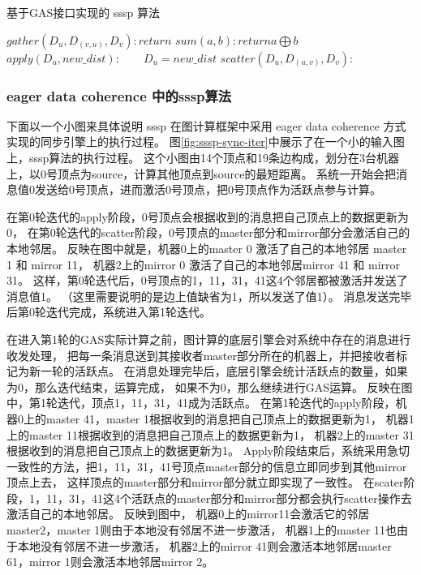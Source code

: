 \begin{algorithm}[!htbp]
  \small
  \caption{基于GAS接口实现的 sssp 算法}\label{alg:sssp}
  \begin{algorithmic}[1]
    \State $gather(D_u,D_{(v,u)},D_v): return$     
    \State $sum(a,b) : return a\bigoplus b $ 
    \State $apply(D_u, new\_dist): 
      \qquad D_u = new\_dist$
    \State $scatter(D_u, D_{(u,v)}, D_v):$     
    \EndIf
    \EndProcedure
  \end{algorithmic}
\end{algorithm}


\subsubsection{eager data coherence 中的sssp算法}
下面以一个小图来具体说明 sssp 在图计算框架中采用 eager data coherence 方式实现的同步引擎上的执行过程。
图\ref{fig:sssp-sync-iter}中展示了在一个小的输入图上，sssp算法的执行过程。
这个小图由14个顶点和19条边构成，划分在3台机器上，以0号顶点为source，计算其他顶点到source的最短距离。
系统一开始会把消息值0发送给0号顶点，进而激活0号顶点，把0号顶点作为活跃点参与计算。

在第0轮迭代的apply阶段，0号顶点会根据收到的消息把自己顶点上的数据更新为0，
在第0轮迭代的scatter阶段，0号顶点的master部分和mirror部分会激活自己的本地邻居。
反映在图中就是，机器0上的master 0 激活了自己的本地邻居 master 1 和 mirror 11，
机器2上的mirror 0 激活了自己的本地邻居mirror 41 和 mirror 31。
这样，第0轮迭代后，0号顶点的1，11，31，41这4个邻居都被激活并发送了消息值1。
（这里需要说明的是边上值缺省为1，所以发送了值1）。
消息发送完毕后第0轮迭代完成，系统进入第1轮迭代。

在进入第1轮的GAS实际计算之前，图计算的底层引擎会对系统中存在的消息进行收发处理，
把每一条消息送到其接收者master部分所在的机器上，并把接收者标记为新一轮的活跃点。
在消息处理完毕后，底层引擎会统计活跃点的数量，如果为0，那么迭代结束，运算完成，
如果不为0，那么继续进行GAS运算。
反映在图中，第1轮迭代，顶点1，11，31，41成为活跃点。
在第1轮迭代的apply阶段，机器0上的master 41，master 1根据收到的消息把自己顶点上的数据更新为1，
机器1上的master 11根据收到的消息把自己顶点上的数据更新为1，
机器2上的master 31根据收到的消息把自己顶点上的数据更新为1。
Apply阶段结束后，系统采用急切一致性的方法，把1，11，31，41号顶点master部分的信息立即同步到其他mirror顶点上去，
这样顶点的master部分和mirror部分就立即实现了一致性。
在scater阶段，1，11，31，41这4个活跃点的master部分和mirror部分都会执行scatter操作去激活自己的本地邻居。
反映到图中，
机器0上的mirror11会激活它的邻居master2，master 1则由于本地没有邻居不进一步激活，
机器1上的master 11也由于本地没有邻居不进一步激活，
机器2上的mirror 41则会激活本地邻居master 61，mirror 1则会激活本地邻居mirror 2。

